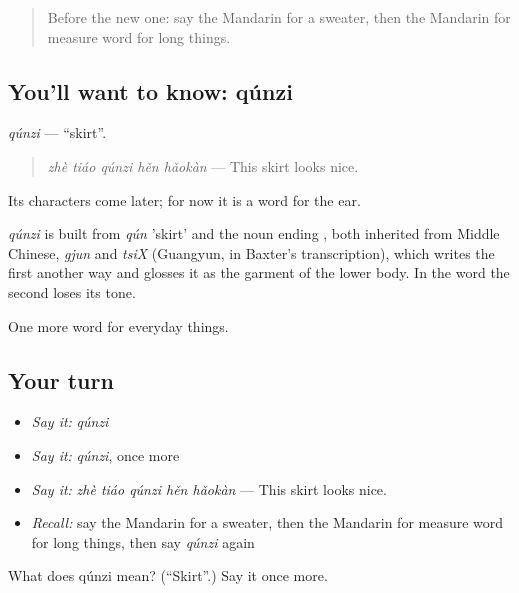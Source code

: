 \label{lesson:ZH-C165-qunzi}



\begin{quote}
Before the new one: say the Mandarin for a sweater, then the Mandarin for measure word for long things.
\end{quote}

\subsection*{You'll want to know: qúnzi}
\emph{qúnzi} — \textquotedblleft{}skirt\textquotedblright{}.

\begin{quote}
\emph{zhè tiáo qúnzi hěn hǎokàn} — This skirt looks nice.
\end{quote}

Its characters come later; for now it is a word for the ear.

\begin{cousinweb}
\emph{qúnzi} is built from \emph{qún} 'skirt' and the noun ending , both inherited from Middle Chinese, \emph{gjun} and \emph{tsiX} (Guangyun, in Baxter's transcription), which writes the first another way and glosses it as the garment of the lower body. In the word the second loses its tone.
\end{cousinweb}

\begin{grammarlens}[title={What you've built}]
One more word for everyday things.
\end{grammarlens}

\subsection*{Your turn}
\begin{itemize}
\raggedright
  \item \emph{Say it:} \emph{qúnzi}
  \item \emph{Say it:} \emph{qúnzi}, once more
  \item \emph{Say it:} \emph{zhè tiáo qúnzi hěn hǎokàn} — This skirt looks nice.
  \item \emph{Recall:} say the Mandarin for a sweater, then the Mandarin for measure word for long things, then say \emph{qúnzi} again
\end{itemize}

\begin{tcolorbox}[breakable,colback=teal!4,colframe=teal!35!black,title={Before you move on}]
What does qúnzi mean? (\textquotedblleft{}Skirt\textquotedblright{}.) Say it once more.
\end{tcolorbox}
